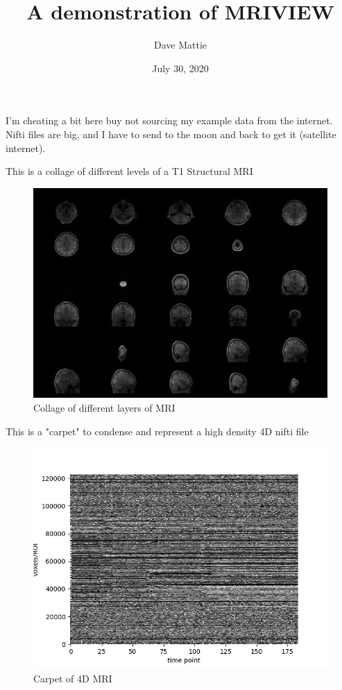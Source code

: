 \documentclass[]{report}
\begin{document}
\title{A demonstration of MRIVIEW}
\author{Dave Mattie}
\date{July 30, 2020}
\maketitle

I'm cheating a bit here buy not sourcing my example data from the internet.  Nifti files are big, and I have to send to the moon and back to get it (satellite internet).

This is a collage of different levels of a T1 Structural MRI

\begin{figure}[h!]
\centering
\includegraphics[scale=0.22]{collage}
\caption{Collage of different layers of MRI}
\label{fig:collage}
\end{figure}

This is a "carpet" to condense and represent a high density 4D nifti file

\begin{figure}[h!]
\centering
\includegraphics[scale=0.6]{carpet}
\caption{Carpet of 4D MRI}
\label{fig:carpet}
\end{figure}
\end{document}

